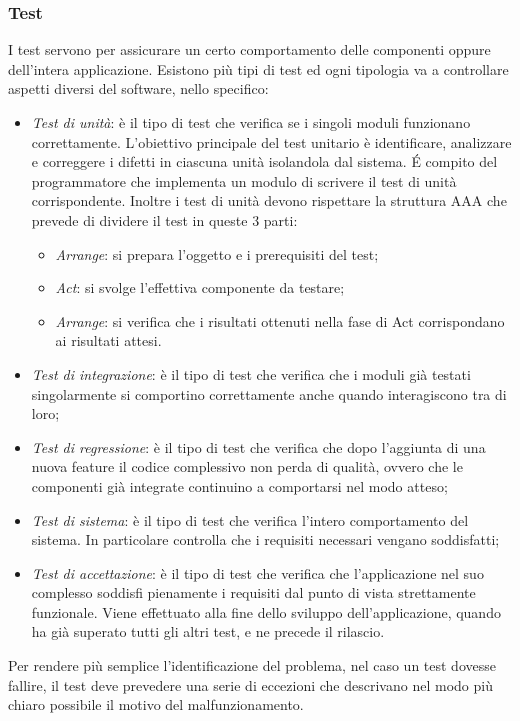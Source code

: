 \subsubsection{Test}
I test servono per assicurare un certo comportamento delle componenti oppure dell'intera applicazione. Esistono più tipi di test ed ogni tipologia va a controllare aspetti diversi del software, nello specifico:
\begin{itemize}
    \item \textit{Test di unità}:  è il tipo di test che verifica se i singoli moduli funzionano correttamente. L'obiettivo principale del test unitario è identificare, analizzare e correggere i difetti in ciascuna unità isolandola dal sistema. É compito del programmatore che implementa un modulo di scrivere il test di unità corrispondente. Inoltre i test di unità devono rispettare la struttura AAA che prevede di dividere il test in queste 3 parti:
	\begin{itemize}
		\item \textit{Arrange}: si prepara l'oggetto e i prerequisiti del test;
		\item \textit{Act}: si svolge l'effettiva componente da testare;
		\item \textit{Arrange}: si verifica che i risultati ottenuti nella fase di Act corrispondano ai risultati attesi.
	\end{itemize}
    \item \textit{Test di integrazione}: è il tipo di test che verifica che i moduli già testati singolarmente si comportino correttamente anche quando interagiscono tra di loro;
    \item \textit{Test di regressione}: è il tipo di test che verifica che dopo l'aggiunta di una nuova feature il codice complessivo non perda di qualità, ovvero che le componenti già integrate continuino a comportarsi nel modo atteso;
    \item \textit{Test di sistema}:  è il tipo di test che verifica l'intero comportamento del sistema. In particolare controlla che i requisiti necessari vengano soddisfatti;
    \item \textit{Test di accettazione}:  è il tipo di test che verifica che l'applicazione nel suo complesso soddisfi pienamente i requisiti dal punto di vista strettamente funzionale. Viene effettuato alla fine dello sviluppo dell'applicazione, quando ha già superato tutti gli altri test, e ne precede il rilascio.
\end{itemize}
Per rendere più semplice l'identificazione del problema, nel caso un test dovesse fallire, il test deve prevedere una serie di eccezioni che descrivano nel modo più chiaro possibile il motivo del malfunzionamento.

